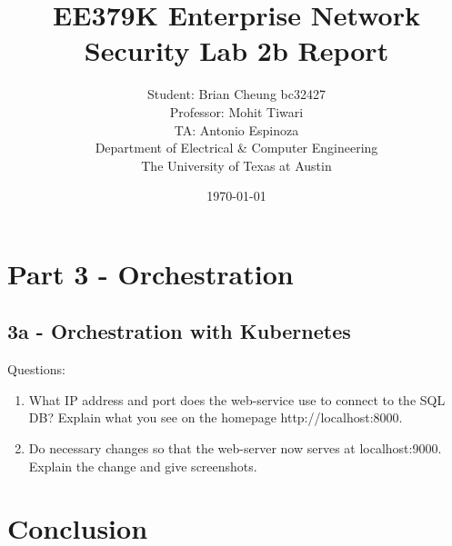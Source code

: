 \documentclass[11pt]{article}
\author{Student: Brian Cheung bc32427 \\ Professor: Mohit Tiwari \\ TA: Antonio Espinoza \\ Department of Electrical \& Computer Engineering \\ The University of Texas at Austin}
\date{\today}
\title{EE379K Enterprise Network Security Lab 2b Report}
\begin{document}
\maketitle
\newpage
\section*{Part 3 - Orchestration}
\label{sec:part-1}
\subsection*{3a - Orchestration with Kubernetes}

\noindent Questions:
\begin{enumerate}
  \item What IP address and port does the web-service use to connect to the SQL DB? Explain what you see on the homepage http://localhost:8000.


  \item Do necessary changes so that the web-server now serves at localhost:9000. Explain the change and give screenshots.

\end{enumerate}

\section*{Conclusion}
\label{sec:conclusion}


\newpage
\nocite{*}


\end{document}
